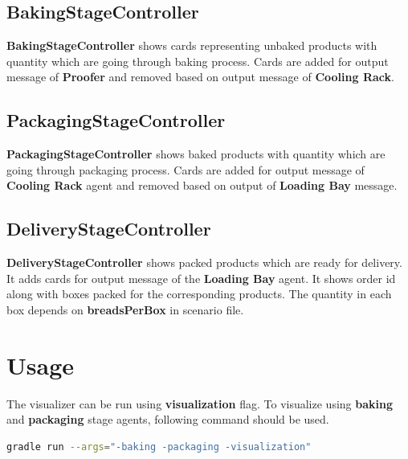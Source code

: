 \documentclass[12pt]{article}
\begin{document}
\subsection{BakingStageController}
\textbf{BakingStageController} shows cards representing unbaked products with quantity which are going through baking process. Cards are added for output message of \textbf{Proofer} and removed based on output message of \textbf{Cooling Rack}.

\subsection{PackagingStageController}
\textbf{PackagingStageController} shows baked products with quantity which are going through packaging process. Cards are added for output message of \textbf{Cooling Rack} agent and removed based on output of \textbf{Loading Bay} message.

\subsection{DeliveryStageController}
\textbf{DeliveryStageController} shows packed products which are ready for delivery. It adds cards for output message of the \textbf{Loading Bay} agent. It shows order id along with boxes packed for the corresponding products. The quantity in each box depends on \textbf{breadsPerBox} in scenario file.

\section{Usage}

The visualizer can be run using \textbf{visualization} flag. To visualize using \textbf{baking} and \textbf{packaging} stage agents, following command should be used.

\begin{lstlisting}[language=bash]
gradle run --args="-baking -packaging -visualization"
\end{lstlisting}
\end{document}
